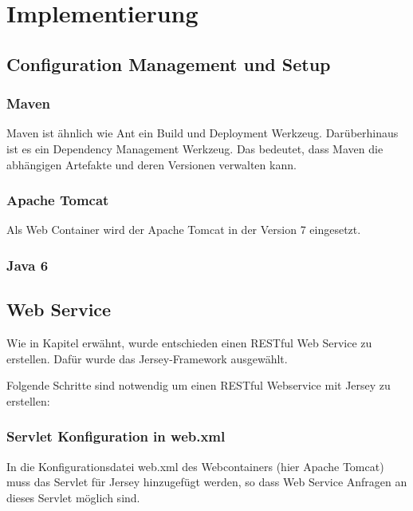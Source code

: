 \chapter{Implementierung} \label{kap:implementierung}

\section{Configuration Management und Setup}

\subsection{Maven}
Maven ist ähnlich wie Ant ein Build und Deployment Werkzeug. Darüberhinaus ist es ein Dependency Management Werkzeug. Das bedeutet, dass Maven die abhängigen Artefakte und deren Versionen verwalten kann. 

\subsection{Apache Tomcat}
Als Web Container wird der \gls{Apache Tomcat} in der Version 7 eingesetzt. 

\subsection{Java 6}

\section{Web Service}\label{kap:webservice}

Wie in Kapitel  erwähnt, wurde entschieden einen \gls{REST}ful Web Service zu erstellen. Dafür wurde das Jersey-Framework ausgewählt.

Folgende Schritte sind notwendig um einen \gls{REST}ful Webservice mit Jersey zu erstellen: 

\subsection{Servlet Konfiguration in web.xml} 

In die Konfigurationsdatei web.xml des Webcontainers (hier \gls{Apache Tomcat}) muss das Servlet für \gls{Jersey} hinzugefügt werden, so dass \gls{Web Service} Anfragen an dieses Servlet möglich sind. 

